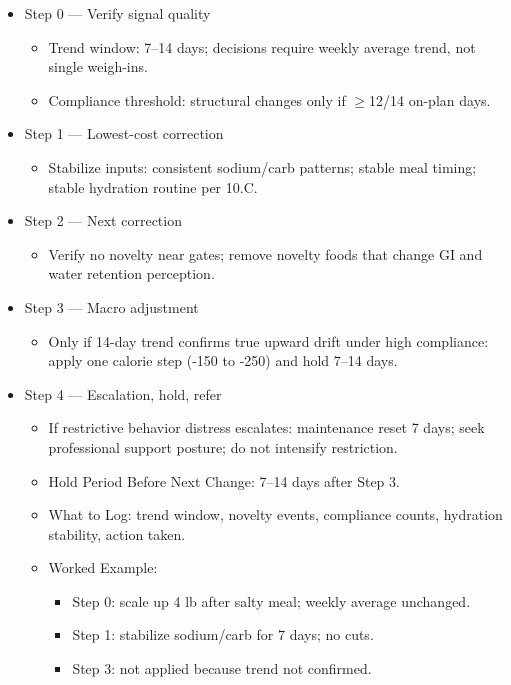 \documentclass[10pt]{article}
\begin{document}
\begin{itemize}
\item Step 0 — Verify signal quality
  \begin{itemize}
  \item Trend window: 7–14 days; decisions require weekly average trend, not single weigh-ins.
  \item Compliance threshold: structural changes only if $\geq$12/14 on-plan days.
  \end{itemize}
\item Step 1 — Lowest-cost correction
  \begin{itemize}
  \item Stabilize inputs: consistent sodium/carb patterns; stable meal timing; stable hydration routine per 10.C.
  \end{itemize}
\item Step 2 — Next correction
  \begin{itemize}
  \item Verify no novelty near gates; remove novelty foods that change GI and water retention perception.
  \end{itemize}
\item Step 3 — Macro adjustment
  \begin{itemize}
  \item Only if 14-day trend confirms true upward drift under high compliance: apply one calorie step (-150 to -250) and hold 7–14 days.
  \end{itemize}
\item Step 4 — Escalation, hold, refer
  \begin{itemize}
  \item If restrictive behavior distress escalates: maintenance reset 7 days; seek professional support posture; do not intensify restriction.
  \item Hold Period Before Next Change: 7–14 days after Step 3.
  \item What to Log: trend window, novelty events, compliance counts, hydration stability, action taken.
  \item Worked Example:
    \begin{itemize}
    \item Step 0: scale up 4 lb after salty meal; weekly average unchanged.
    \item Step 1: stabilize sodium/carb for 7 days; no cuts.
    \item Step 3: not applied because trend not confirmed.
    \end{itemize}
  \end{itemize}
\end{itemize}
\end{document}
